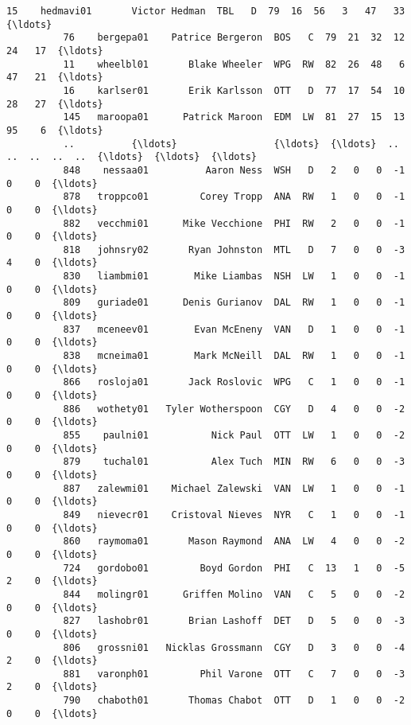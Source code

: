 \documentclass[11pt]{article}
\begin{document}
\begin{Verbatim}[commandchars=\\\{\}]
          15    hedmavi01       Victor Hedman  TBL   D  79  16  56   3   47   33  {\ldots}     
          76    bergepa01    Patrice Bergeron  BOS   C  79  21  32  12   24   17  {\ldots}     
          11    wheelbl01       Blake Wheeler  WPG  RW  82  26  48   6   47   21  {\ldots}     
          16    karlser01       Erik Karlsson  OTT   D  77  17  54  10   28   27  {\ldots}     
          145   maroopa01      Patrick Maroon  EDM  LW  81  27  15  13   95    6  {\ldots}     
          ..          {\ldots}                 {\ldots}  {\ldots}  ..  ..  ..  ..  ..  {\ldots}  {\ldots}  {\ldots}     
          848    nessaa01          Aaron Ness  WSH   D   2   0   0  -1    0    0  {\ldots}     
          878   troppco01         Corey Tropp  ANA  RW   1   0   0  -1    0    0  {\ldots}     
          882   vecchmi01      Mike Vecchione  PHI  RW   2   0   0  -1    0    0  {\ldots}     
          818   johnsry02       Ryan Johnston  MTL   D   7   0   0  -3    4    0  {\ldots}     
          830   liambmi01        Mike Liambas  NSH  LW   1   0   0  -1    0    0  {\ldots}     
          809   guriade01      Denis Gurianov  DAL  RW   1   0   0  -1    0    0  {\ldots}     
          837   mceneev01        Evan McEneny  VAN   D   1   0   0  -1    0    0  {\ldots}     
          838   mcneima01        Mark McNeill  DAL  RW   1   0   0  -1    0    0  {\ldots}     
          866   rosloja01       Jack Roslovic  WPG   C   1   0   0  -1    0    0  {\ldots}     
          886   wothety01   Tyler Wotherspoon  CGY   D   4   0   0  -2    0    0  {\ldots}     
          855    paulni01           Nick Paul  OTT  LW   1   0   0  -2    0    0  {\ldots}     
          879    tuchal01           Alex Tuch  MIN  RW   6   0   0  -3    0    0  {\ldots}     
          887   zalewmi01    Michael Zalewski  VAN  LW   1   0   0  -1    0    0  {\ldots}     
          849   nievecr01    Cristoval Nieves  NYR   C   1   0   0  -1    0    0  {\ldots}     
          860   raymoma01       Mason Raymond  ANA  LW   4   0   0  -2    0    0  {\ldots}     
          724   gordobo01         Boyd Gordon  PHI   C  13   1   0  -5    2    0  {\ldots}     
          844   molingr01      Griffen Molino  VAN   C   5   0   0  -2    0    0  {\ldots}     
          827   lashobr01       Brian Lashoff  DET   D   5   0   0  -3    0    0  {\ldots}     
          806   grossni01   Nicklas Grossmann  CGY   D   3   0   0  -4    2    0  {\ldots}     
          881   varonph01         Phil Varone  OTT   C   7   0   0  -3    2    0  {\ldots}     
          790   chaboth01       Thomas Chabot  OTT   D   1   0   0  -2    0    0  {\ldots}     

\end{Verbatim}
\end{document}
